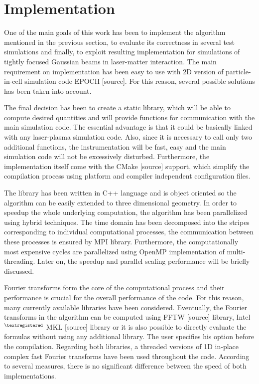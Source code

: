 \section{Implementation}

One of the main goals of this work has been to implement the algorithm mentioned in the previous section, to evaluate its correctness in several test simulations and finally, to exploit resulting implementation for simulations of tightly focused Gaussian beams in laser-matter interaction. The main requirement on implementation has been easy to use with 2D version of particle-in-cell simulation code EPOCH [source]. For this reason, several possible solutions has been taken into account.

The final decision has been to create a static library, which will be able to compute desired quantities and will provide functions for communication with the main simulation code. The essential advantage is that it could be basically linked with any laser-plasma simulation code. Also, since it is necessary to call only two additional functions, the instrumentation will be fast, easy and the main simulation code will not be excessively disturbed. Furthermore, the implementation itself come with the CMake [source] support, which simplify the compilation process using platform and compiler independent configuration files.

The library has been written in C++ language and is object oriented so the algorithm can be easily extended to three dimensional geometry. In order to speedup the whole underlying computation, the algorithm has been parallelized using hybrid techniques. The time domain has been decomposed into the stripes corresponding to individual computational processes, the communication between these processes is ensured by MPI library. Furthermore, the computationally most expensive cycles are parallelized using OpenMP implementation of multi-threading. Later on, the speedup and parallel scaling performance will be briefly discussed.

Fourier transforms form the core of the computational process and their performance is crucial for the overall performance of the code. For this reason, many currently available libraries have been considered. Eventually, the Fourier transforms in the algorithm can be computed using FFTW [source] library, Intel$ ^{\scriptsize \textregistered} $ MKL [source] library or it is also possible to directly evaluate the formulas without using any additional library. The user specifies his option before the compilation. Regarding both libraries, a threaded versions of 1D in-place complex fast Fourier transforms have been used throughout the code. According to several measures, there is no significant difference between the speed of both implementations.

